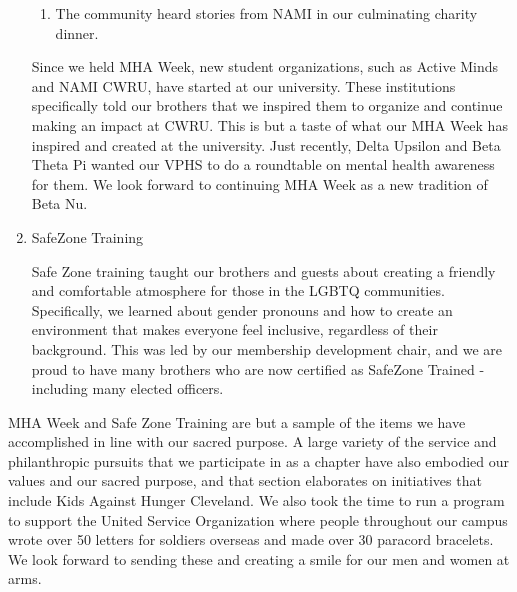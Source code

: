 \begin{enumerate}
\begin{enumerate}
	      \item The community heard stories from NAMI in our culminating charity dinner.
  	\end{enumerate}
  	
  	Since we held MHA Week, new student organizations, such as Active Minds and NAMI CWRU, have started at our university. These institutions specifically told our brothers that we inspired them to organize and continue making an impact at CWRU. This is but a taste of what our MHA Week has inspired and created at the university. Just recently, Delta Upsilon and Beta Theta Pi wanted our VPHS to do a roundtable on mental health awareness for them. We look forward to continuing MHA Week as a new tradition of Beta Nu.
  	
  	\item SafeZone Training
	  
	  Safe Zone training taught our brothers and guests about creating a friendly and comfortable atmosphere for those in the LGBTQ communities. Specifically, we learned about gender pronouns and how to create an environment that makes everyone feel inclusive, regardless of their background. This was led by our membership development chair, and we are proud to have many brothers who are now certified as SafeZone Trained - including many elected officers.
	  
  \end{enumerate}
  
  MHA Week and Safe Zone Training are but a sample of the items we have accomplished in line with our sacred purpose. A large variety of the service and philanthropic pursuits that we participate in as a chapter have also embodied our values and our sacred purpose, and that section elaborates on initiatives that include Kids Against Hunger Cleveland. We also took the time to run a program to support the United Service Organization where people throughout our campus wrote over 50 letters for soldiers overseas and made over 30 paracord bracelets. We look forward to sending these and creating a smile for our men and women at arms.